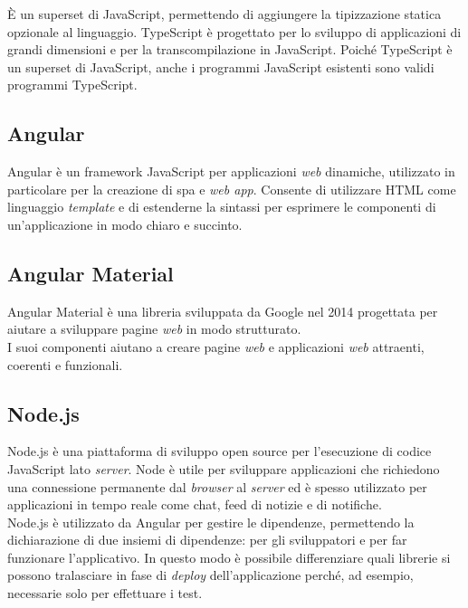 \noindent È un \gls{superset} di JavaScript, permettendo di aggiungere la
tipizzazione
statica opzionale al linguaggio. TypeScript è progettato per lo sviluppo di
applicazioni
di grandi dimensioni e per la \gls{transcompilazione} in JavaScript. Poiché
TypeScript è un \gls{superset} di JavaScript, anche i programmi JavaScript
esistenti sono validi programmi TypeScript. \cite{site-typescript}
\subsection*{Angular}
Angular è un \gls{framework} JavaScript per applicazioni \textit{web}
dinamiche, utilizzato in particolare per la creazione di \gls{spa} e
\textit{web app}. Consente di utilizzare HTML come linguaggio \textit{template}
e di estenderne la sintassi per esprimere le componenti di un'applicazione in
modo chiaro e succinto.

\subsection*{Angular Material}
Angular Material è una libreria sviluppata da Google nel 2014 progettata per
aiutare a sviluppare pagine \textit{web} in modo strutturato. \\
I suoi componenti aiutano a creare pagine \textit{web} e applicazioni
\textit{web} attraenti, coerenti e funzionali. \cite{site-Angular}

\subsection*{Node.js}
Node.js è una piattaforma di sviluppo open source per l'esecuzione di codice
JavaScript lato \textit{server}. Node è utile per sviluppare applicazioni che
richiedono una connessione permanente dal \textit{browser} al \textit{server}
ed è spesso utilizzato per applicazioni in tempo reale come chat, feed di
notizie e di notifiche.\\
Node.js è utilizzato da Angular per gestire le dipendenze, permettendo la
dichiarazione di due insiemi di dipendenze: per gli sviluppatori e per far
funzionare l'applicativo. In questo modo è possibile differenziare quali
librerie si possono tralasciare in fase di \textit{deploy} dell'applicazione
perché, ad esempio, necessarie solo per effettuare i test. \cite{site-node}
